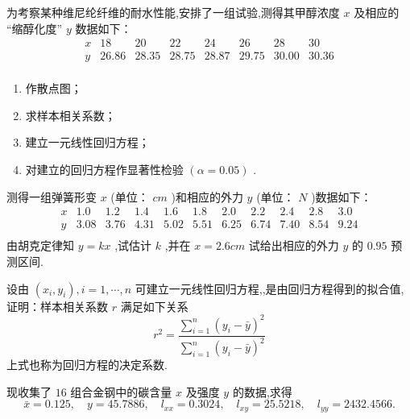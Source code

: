 \begin{xiti}
    \item 为考察某种维尼纶纤维的耐水性能,安排了一组试验,测得其甲醇浓度 $x$ 及相应的
    “缩醇化度” $y$ 数据如下：
    \begin{equation*}
    \begin{array}{c|ccccccc}
    x     & 18    & 20    & 22    & 24    & 26    & 28    & 30 \\\hline
    y     & 26.86  & 28.35  & 28.75  & 28.87  & 29.75  & 30.00  & 30.36  \\
    \end{array}%
    \end{equation*}
    \begin{enumerate}
        \item 作散点图；
        \item 求样本相关系数；
        \item 建立一元线性回归方程；
        \item 对建立的回归方程作显著性检验 $(\alpha=0.05)$ .
    \end{enumerate}
    \item 测得一组弹簧形变 $x$ (单位： $\si{cm}$ )和相应的外力 $y$ (单位： $\si{N}$ )数据如下：%
    \begin{equation*}
    \begin{array}{c|cccccccccc}
    x     & 1.0   & 1.2   & 1.4   & 1.6   & 1.8   & 2.0   & 2.2   & 2.4   & 2.8   & 3.0  \\\hline
    y     & 3.08  & 3.76  & 4.31  & 5.02  & 5.51  & 6.25  & 6.74  & 7.40  & 8.54  & 9.24  \\
    \end{array}%
    \end{equation*}
    由胡克定律知 $y=kx$ ,试估计 $k$ ,并在 $x=2.6 \si{cm}$ 试给出相应的外力 $y$ 的 $0.95$ 预测区间.
    \item 设由 $(x_i,y_i),i=1,\cdots,n$ 可建立一元线性回归方程,,是由回归方程得到的拟合值,证明：样本相关系数 $r$ 满足如下关系
    \begin{equation*}
    r^{2}=\frac{\sum_{i=1}^{n}\left(y_{i}-\bar{y}\right)^{2}}{\sum_{i=1}^{n}\left(y_{i}-\bar{y}\right)^{2}}
    \end{equation*}
    上式也称为回归方程的决定系数.
    \item 现收集了 $16$ 组合金钢中的碳含量 $x$ 及强度 $y$ 的数据,求得
    \begin{equation*}
    \bar{x}=0.125, \quad y=45.7886,\quad l_{xx}=0.3024,\quad l_{xy}=25.5218,\quad l_{yy}=2432.4566.

\end{equation*}
\end{xiti}

